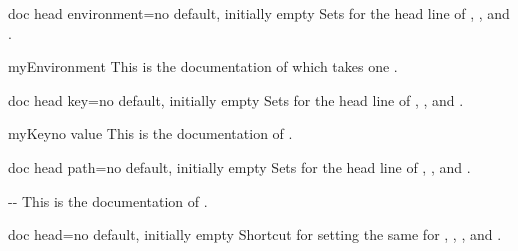 \clearpage

\begin{docTcbKey}{doc head environment}{=}{no default, initially empty}
  Sets  for the head line of
  , , and .
\begin{dispExample}

\begin{docEnvironment*}{myEnvironment}{}
  This is the documentation of  which
  takes one .
\end{docEnvironment*}
\end{dispExample}
\end{docTcbKey}

\begin{docTcbKey}{doc head key}{=}{no default, initially empty}
  Sets  for the head line of
  , , and .
\begin{dispExample}

\begin{docKey}[foo]{myKey}{}{no value}
  This is the documentation of .
\end{docKey}
\end{dispExample}
\end{docTcbKey}


\begin{docTcbKey}[][doc new=2019-09-18]{doc head path}{=}{no default, initially empty}
  Sets  for the head line of
  , , and .
\begin{dispExample}

\begin{docPathOperation*}{-{}-}{}
  This is the documentation of .
\end{docPathOperation*}
\end{dispExample}
\end{docTcbKey}


\begin{docTcbKey}[][doc updated=2019-09-18]{doc head}{=}{no default, initially empty}
  Shortcut for setting the same  for
  , ,
  , and .
\end{docTcbKey}


